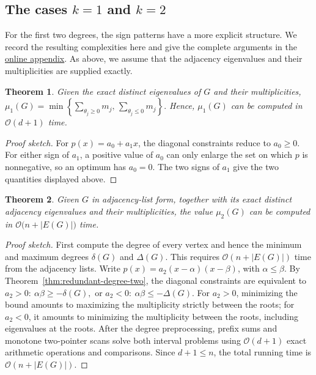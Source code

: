 \documentclass[10pt]{article}
\newtheorem{theorem}{Theorem}[section]
\begin{document}
\subsection{The cases \(k=1\) and \(k=2\)}

For the first two degrees, the sign patterns have a more
explicit structure. We record the resulting complexities here and give the
complete arguments in the \href{https://github.com/Valentin-Michaux/Optimization-of-inertia-type-bounds-on-the-independence-and-chromatic-numbers-of-graph-powers/blob/main/Online%20Appendix.pdf}
{online appendix}. As above, we assume that the adjacency
eigenvalues and their multiplicities are supplied exactly.

\begin{theorem}
\label{thm:k1}
Given the exact distinct eigenvalues of \(G\)
and their multiplicities,
\(
\mu_1(G)=
\min\left\{
\sum_{\theta_j\geq0}m_j,\,
\sum_{\theta_j\leq0}m_j
\right\}.
\)
Hence, \(\mu_1(G)\) can be computed in
\(\mathcal O(d+1)\) time.
\end{theorem}

\begin{proof}[Proof sketch]
For \(p(x)=a_0+a_1x\), the diagonal constraints reduce to
\(a_0\geq0\). For either sign of \(a_1\), a positive value of \(a_0\) can
only enlarge the set on which \(p\) is nonnegative, so an optimum has
\(a_0=0\). The two signs of \(a_1\) give the two quantities displayed
above.
\end{proof}

\begin{theorem}
\label{thm:k2}
Given \(G\) in adjacency-list form, together with its
exact distinct adjacency eigenvalues and their multiplicities, the value
\(\mu_2(G)\) can be computed in
\(
\mathcal O\bigl(n+|E(G)|\bigr)
\) time.
\end{theorem}

\begin{proof}[Proof sketch]
First compute the degree of every vertex and hence the
minimum and maximum degrees \(\delta(G)\) and \(\Delta(G)\). This requires
\(\mathcal O(n+|E(G)|)\) time from the adjacency lists. Write
\(p(x)=a_2(x-\alpha)(x-\beta)\), with \(\alpha\leq\beta\). By
Theorem~\ref{thm:redundant-degree-two}, the diagonal constraints are
equivalent to
\(
a_2>0:\ \alpha\beta\geq-\delta(G), \text{ or }
a_2<0:\ \alpha\beta\leq-\Delta(G).
\)
For \(a_2>0\), minimizing the bound amounts to maximizing
the multiplicity strictly between the roots; for \(a_2<0\), it amounts to
minimizing the multiplicity between the roots, including eigenvalues at the
roots. After the degree preprocessing, prefix sums and monotone two-pointer
scans solve both interval problems using \(\mathcal O(d+1)\) exact
arithmetic operations and comparisons. Since \(d+1\leq n\), the total
running time is \(\mathcal O(n+|E(G)|)\).
\end{proof}
\end{document}
